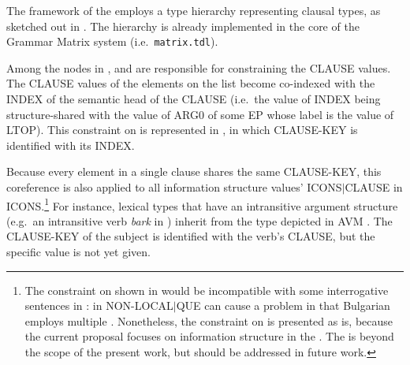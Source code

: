 The framework of the \lingo {} employs a type hierarchy
representing clausal types, as sketched out in . The
 hierarchy is already implemented in the core of the
\lingo Grammar Matrix system (i.e.\ \texttt{matrix.tdl}).





\noindent Among the nodes in , 
and  are responsible for constraining the CLAUSE
values.  The CLAUSE values of the elements on the  list
become co-indexed with the INDEX of the semantic head of the CLAUSE
(i.e.\ the value of INDEX being structure-shared with the value of
ARG0 of some EP whose label is the value of LTOP).  This constraint on
 is represented in , in
which CLAUSE-KEY is identified with its INDEX.
 

\noindent Because every element in a single clause shares the same
CLAUSE-KEY, this coreference is also applied to all
information structure values' \mbox{ICONS{$\mid$}CLAUSE} in
ICONS.\footnote{The constraint on
   shown in  would be incompatible
  with some interrogative sentences in :
   in NON-LOCAL{$\mid$}QUE can cause a problem in
  that Bulgarian employs multiple 
  \citep{grewendorf:01}.  Nonetheless, the constraint on
   is presented as is, because the current
  proposal focuses on information structure in the \lingo {}. The  is beyond the scope of the
  present work, but should be addressed in future work.} For instance,
lexical types that have an intransitive argument structure (e.g.\ an
intransitive verb \textit{bark} in ) inherit from the type
depicted in AVM .  The CLAUSE-KEY of the
subject is identified with the verb's CLAUSE, but the specific value
is not yet given.



